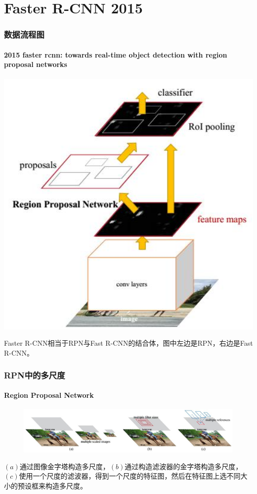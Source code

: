 \documentclass{beamer}
\begin{document}
    \section{Faster R-CNN 2015}

    \begin{frame}
        \frametitle{数据流程图}
        \framesubtitle{2015 faster rcnn: towards real-time object detection with region proposal networks}
        \begin{minipage}[c]{0.6\linewidth}
            \centering
            \includegraphics[width=1.0\textwidth]{../graphic/fastercnnflow.jpg}
        \end{minipage}%
        \begin{minipage}[c]{0.45\linewidth}
            Faster R-CNN相当于RPN与Fast R-CNN的结合体，图中左边是RPN，右边是Fast R-CNN。
        \end{minipage}
    \end{frame}
    
    \begin{frame}
        \frametitle{RPN中的多尺度}
        \framesubtitle{Region Proposal Network}
        \begin{figure}
            \centering
            \includegraphics[height=2.3cm]{../graphic/fastermultisize.jpg}
        \end{figure}
        $(a)$通过图像金字塔构造多尺度，$(b)$通过构造滤波器的金字塔构造多尺度，$(c)$使用一个尺度的滤波器，得到一个尺度的特征图，然后在特征图上选不同大小的预设框来构造多尺度。
    \end{frame}
    
\end{document}
